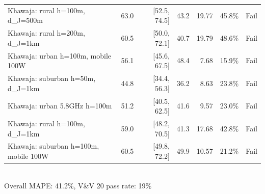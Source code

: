 \begin{table}[htbp]
\begin{tabular}{lrrrrrr}
Khawaja: rural h=100m, d_J=500m & 63.0 & [52.5, 74.5] & 43.2 & 19.77 & 45.8\% & Fail \\
Khawaja: rural h=200m, d_J=1km & 60.5 & [50.0, 72.1] & 40.7 & 19.79 & 48.6\% & Fail \\
Khawaja: urban h=100m, mobile 100W & 56.1 & [45.6, 67.5] & 48.4 & 7.68 & 15.9\% & Fail \\
Khawaja: suburban h=50m, d_J=1km & 44.8 & [34.4, 56.3] & 36.2 & 8.63 & 23.8\% & Fail \\
Khawaja: urban 5.8GHz h=100m & 51.2 & [40.5, 62.5] & 41.6 & 9.57 & 23.0\% & Fail \\
Khawaja: rural h=100m, d_J=1km & 59.0 & [48.2, 70.5] & 41.3 & 17.68 & 42.8\% & Fail \\
Khawaja: suburban h=100m, mobile 100W & 60.5 & [49.8, 72.2] & 49.9 & 10.57 & 21.2\% & Fail \\
\bottomrule
\end{tabular}
\\[2pt]
\footnotesize{Overall MAPE: 41.2\%, V\&V 20 pass rate: 19\%}
\end{table}